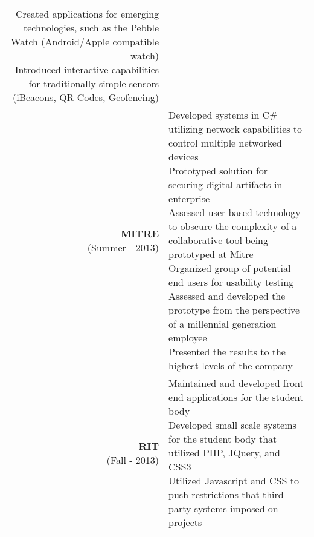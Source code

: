 \documentclass{article}
\makeatletter
\newcommand*\lineBr[2][c]{\begin{tabular}[#1]{@{}r@{}}#2\end{tabular}}
\newcommand*\lineBl[2][c]{\begin{tabular}[#1]{@{}l@{}}#2\end{tabular}}
\makeatother
\begin{document}
\begin{tabularx}{\textwidth}{ r | X }
{    Created applications for emerging technologies, such as the Pebble Watch (Android/Apple compatible watch) \\
    Introduced interactive capabilities for traditionally simple sensors (iBeacons, QR Codes, Geofencing) \\
  } \\
  \vspace{2mm}
  \lineBr{ {\large {\bf MITRE } \\ (Summer - 2013)} } &
  \lineBl{
    Developed systems in C\# utilizing network capabilities to control multiple networked devices \\
    Prototyped solution for securing digital artifacts in enterprise \\
    Assessed user based technology to obscure the complexity of a collaborative tool being prototyped at Mitre \\
    Organized group of potential end users for usability testing \\
    Assessed and developed the prototype from the perspective of a millennial generation employee \\
    Presented the results to the highest levels of the company \\
  } \\
  \vspace{2mm}
  \lineBr{ {\large {\bf RIT } \\ (Fall - 2013)} } &
  \lineBl{
    Maintained and developed front end applications for the student body \\
    Developed small scale systems for the student body that utilized PHP, JQuery, and CSS3 \\
    Utilized Javascript and CSS to push restrictions that third party systems imposed on projects \\
  }
\end{tabularx}
\end{document}

